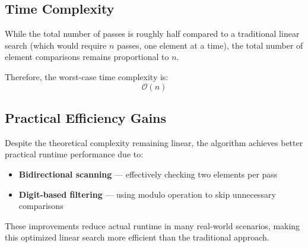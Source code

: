 \subsection*{Time Complexity}

While the total number of passes is roughly half compared to a traditional linear search (which would require $n$ passes, one element at a time), the total number of element comparisons remains proportional to $n$.

Therefore, the worst-case time complexity is:
\[
\mathcal{O}(n)
\]

\subsection*{Practical Efficiency Gains}

Despite the theoretical complexity remaining linear, the algorithm achieves better practical runtime performance due to:

\begin{itemize}
	\item \textbf{Bidirectional scanning} — effectively checking two elements per pass
	\item \textbf{Digit-based filtering} — using modulo operation to skip unnecessary comparisons
\end{itemize}

These improvements reduce actual runtime in many real-world scenarios, making this optimized linear search more efficient than the traditional approach.

